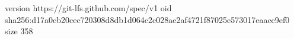 version https://git-lfs.github.com/spec/v1
oid sha256:d17a0cb20cec720308d8db1d064c2c028ae2af4721f87025e573017eaacc9ef0
size 358
